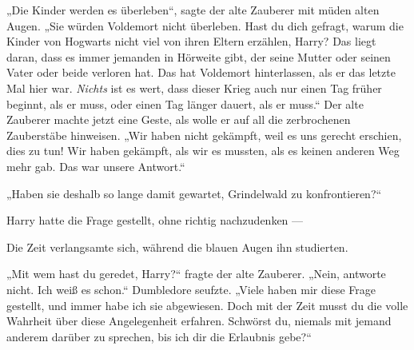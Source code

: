 „Die Kinder werden es überleben“, sagte der alte Zauberer mit müden alten Augen.
„Sie würden Voldemort nicht überleben. Hast du dich gefragt, warum die Kinder von Hogwarts nicht viel von ihren Eltern erzählen, Harry? Das liegt daran, dass es immer jemanden in Hörweite gibt, der seine Mutter oder seinen Vater oder beide verloren hat. Das hat Voldemort hinterlassen, als er das letzte Mal hier war. \emph{Nichts} ist es wert, dass dieser Krieg auch nur einen Tag früher beginnt, als er muss, oder einen Tag länger dauert, als er muss.“ Der alte Zauberer machte jetzt eine Geste, als wolle er auf all die zerbrochenen Zauberstäbe hinweisen.
„Wir haben nicht gekämpft, weil es uns gerecht erschien, dies zu tun! Wir haben gekämpft, als wir es mussten, als es keinen anderen Weg mehr gab. Das war unsere Antwort.“

„Haben sie deshalb so lange damit gewartet, Grindelwald zu konfrontieren?“

Harry hatte die Frage gestellt, ohne richtig nachzudenken —

Die Zeit verlangsamte sich, während die blauen Augen ihn studierten.

„Mit wem hast du geredet, Harry?“ fragte der alte Zauberer.
„Nein, antworte nicht. Ich weiß es schon.“ Dumbledore seufzte.
„Viele haben mir diese Frage gestellt, und immer habe ich sie abgewiesen. Doch mit der Zeit musst du die volle Wahrheit über diese Angelegenheit erfahren. Schwörst du, niemals mit jemand anderem darüber zu sprechen, bis ich dir die Erlaubnis gebe?“

